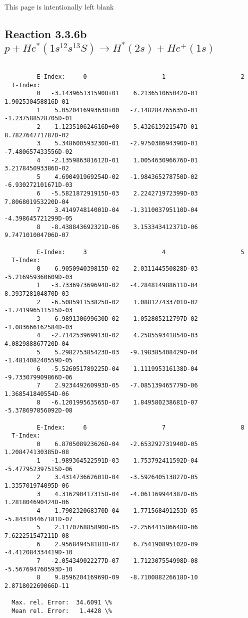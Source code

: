 \documentclass[12pt,dvipdfmx]{article}
\begin{document}
\newpage
This page is intentionally left blank
\newpage

\subsection{
Reaction 3.3.6b   $p + He^*(1s^12s^13S) \rightarrow H^*(2s) + He^+(1s) $
}


\begin{small}\begin{verbatim}

         E-Index:     0                     1                     2
  T-Index:
         0   -3.143965131590D+01    6.213651065042D-01    1.902530458816D-01
         1    5.052041699363D+00   -7.148284765635D-01   -1.237588528705D-01
         2   -1.123510624616D+00    5.432613921547D-01    8.782764771787D-02
         3    5.348600593230D-01   -2.975038694390D-01   -7.480657433556D-02
         4   -2.135986381612D-01    1.005463096676D-01    3.217845093386D-02
         5    4.690491969254D-02   -1.984365278750D-02   -6.930272101671D-03
         6   -5.582187291915D-03    2.224271972399D-03    7.806801953220D-04
         7    3.414974814001D-04   -1.311003795110D-04   -4.398645721299D-05
         8   -8.438843692321D-06    3.153343412371D-06    9.747101004706D-07

         E-Index:     3                     4                     5
  T-Index:
         0    6.905094039815D-02    2.031144550828D-03   -5.216959360609D-03
         1   -3.733697369694D-02   -4.284814988611D-04    8.393728104870D-03
         2   -6.508591153825D-02    1.088127433701D-02   -1.741996511515D-03
         3    6.989130699630D-02   -1.052805212797D-02   -1.083666162584D-03
         4   -2.714253969913D-02    4.258559341854D-03    4.082988867720D-04
         5    5.298275385423D-03   -9.198385408429D-04   -1.481408240559D-05
         6   -5.526051789225D-04    1.111995316138D-04   -9.733079909866D-06
         7    2.923449260993D-05   -7.085139465779D-06    1.368541840554D-06
         8   -6.120199563565D-07    1.849580238681D-07   -5.378697856092D-08

         E-Index:     6                     7                     8
  T-Index:
         0    6.870508923626D-04   -2.653292731940D-05    1.208474130385D-08
         1   -1.989364522591D-03    1.753792411592D-04   -5.477952397515D-06
         2    3.431473662601D-04   -3.592640513827D-05    1.335701974095D-06
         3    4.316290417315D-04   -4.061169944387D-05    1.281804690424D-06
         4   -1.790232068370D-04    1.771568491253D-05   -5.843104467181D-07
         5    2.117076885890D-05   -2.256441586648D-06    7.622251547211D-08
         6    2.956849458181D-07    6.754190895102D-09   -4.412084334419D-10
         7   -2.054349022277D-07    1.712307554998D-08   -5.567694760593D-10
         8    9.859620416969D-09   -8.710088226618D-10    2.871802269066D-11

  Max. rel. Error:  34.6091 \%
  Mean rel. Error:   1.4428 \%
\end{verbatim}\end{small}
\end{document}
